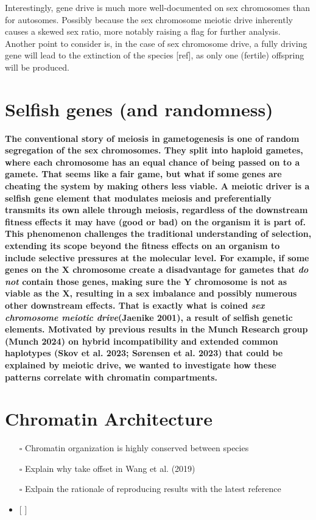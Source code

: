 \documentclass[
  11pt,
  a4paper,
]{scrbook}
\providecommand{\tightlist}{%
  \setlength{\itemsep}{0pt}\setlength{\parskip}{0pt}}\usepackage{longtable,booktabs,array}
\let\oldemph\emph
\renewcommand\emph[1]{\oldemph{\color{gray}#1}}
\begin{document}
Interestingly, gene drive is much more well-documented on sex
chromosomes than for autosomes. Possibly because the sex chromosome
meiotic drive inherently causes a skewed sex ratio, more notably raising
a flag for further analysis. Another point to consider is, in the case
of sex chromosome drive, a fully driving gene will lead to the
extinction of the species {[}ref{]}, as only one (fertile) offspring
will be produced.

\section{Selfish genes (and
randomness)}\label{selfish-genes-and-randomness}

\textbf{The conventional story of meiosis in gametogenesis is one of
random segregation of the sex chromosomes. They split into haploid
gametes, where each chromosome has an equal chance of being passed on to
a gamete. That seems like a fair game, but what if some genes are
cheating the system by making others less viable. A meiotic driver is a
selfish gene element that modulates meiosis and preferentially transmits
its own allele through meiosis, regardless of the downstream fitness
effects it may have (good or bad) on the organism it is part of. This
phenomenon challenges the traditional understanding of selection,
extending its scope beyond the fitness effects on an organism to include
selective pressures at the molecular level. For example, if some genes
on the X chromosome create a disadvantage for gametes that \emph{do not}
contain those genes, making sure the Y chromosome is not as viable as
the X, resulting in a sex imbalance and possibly numerous other
downstream effects. That is exactly what is coined \emph{sex chromosome
meiotic drive}(Jaenike 2001), a result of selfish genetic elements.
Motivated by previous results in the Munch Research group (Munch 2024)
on hybrid incompatibility and extended common haplotypes (Skov et al.
2023; Sørensen et al. 2023) that could be explained by meiotic drive, we
wanted to investigate how these patterns correlate with chromatin
compartments.}

\section{Chromatin Architecture}\label{chromatin-architecture}

\begin{itemize}
\tightlist
\item[$\square$]
  Chromatin organization is highly conserved between species
\item[$\square$]
  Explain why take offset in Wang et al. (2019)
\item[$\square$]
  Exlpain the rationale of reproducing results with the latest reference
\item
  {[} {]}
\end{itemize}
\end{document}
